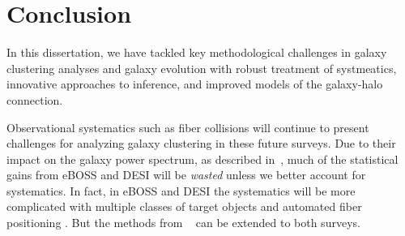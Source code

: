 \chapter*{Conclusion}

In this dissertation, we have tackled key methodological challenges 
in galaxy clustering analyses and galaxy evolution with robust treatment of systmeatics, innovative
approaches to inference, and improved models of the galaxy-halo 
connection. 







Observational systematics such as fiber collisions will continue to present 
challenges for analyzing galaxy clustering in these future surveys. Due to their impact on the
galaxy power spectrum, as described in~, much of the statistical gains from eBOSS 
and DESI will be {\em wasted} unless we better account for systematics. In fact, in eBOSS 
and DESI the systematics will be more complicated with multiple classes of target objects 
and automated fiber positioning \citep{Cahn:2015_desifib, Dawson:2015aa}. But the methods 
from ~ can be extended to both surveys.

